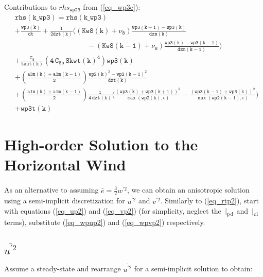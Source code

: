 \documentclass[11pt,fleqn]{article}
\begin{document}
%
Contributions to $rhs_{\mathtt{wp23}}$ from (\ref{eq_wp3e}):
%
\begin{equation}
\begin{split}
& \mathtt{ rhs(k\_wp3) = rhs(k\_wp3) } \\
& \mathtt{
  + \frac{wp3(k)}{dt} 
  + \frac{1}{2dzt(k)}
      \bigg(
              \left(Kw8(k)+\nu_8\right)
              \frac{wp3(k+1)-wp3(k)}{dzm(k)} }  \\
& \mathtt{ \qquad \qquad \qquad \qquad \qquad
            - \left(Kw8(k-1)+\nu_8\right)
              \frac{wp3(k)-wp3(k-1)}{dzm(k-1)}
      \bigg)
  } \\
& \mathtt{
+ \frac{C_8}{taut(k)}
   \left( 4 \, C_{8b} \, {Skwt(k)}^4 \right) wp3(k)
  } \\
& \mathtt{
  + \left(\frac{a3m(k)+a3m(k-1)}{2}\right) \frac{wp2(k)^2 - wp2(k-1)^2 }
                                                {dzt(k)}
  } \\
& \mathtt{
  + \left(\frac{a1m(k)+a1m(k-1)}{2}\right) \frac{1}{4 \, dzt(k)}
    \bigg(
      \frac{ \left(wp3(k)+wp3(k+1)\right)^2 }
           { \max\left( wp2(k), \epsilon \right) }
     -\frac{ \left(wp3(k-1)+wp3(k)\right)^2 }
           { \max\left( wp2(k-1), \epsilon \right) }
    \bigg)
  } \\
& \mathtt{
+ wp3t(k)
  }
\end{split}
\end{equation}

\section{High-order Solution to the Horizontal Wind}
As an alternative to assuming $\bar{e} = \frac{3}{2}\overline{w^{'2}}$, 
we can obtain an anisotropic solution using a semi-implicit discretization for 
$\overline{u^{'2}}$ and $\overline{v^{'2}}$.
Similarly to (\ref{eq_rtp2}), start with equations (\ref{eq_up2}) and 
(\ref{eq_vp2}) (for simplicity, neglect the $\left.\right|_{\rm{pd}}$ and 
$\left.\right|_{\rm{cl}}$ terms), substitute (\ref{eq_wpup2}) and 
(\ref{eq_wpvp2}) respectively.

\subsection{$\overline{u^{'2}}$}
Assume a steady-state and rearrange $\overline{u^{'2}}$ for a semi-implicit
solution to obtain:
\end{document}
